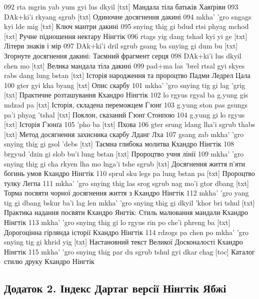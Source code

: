 \documentclass{article}
\begin{document}
092 rta mgrin yab yum gyi lus dkyil [txt] Мандала тіла батьків Хаяґріви
093 DAk+ki'i rkyang sgrub [txt] Одиночне досягнення дакині
094 mkha' 'gro sngags kyi lde mig [txt] Ключ мантри дакині
095 snying thig gi bdud rtsi phyag mchod [txt] Ручне підношення нектару Нінгтік
096 rtags yig dang tshad kyi yi ge [txt] Літери знаків і мір
097 DAk+ki'i dril sgrub gsang ba snying gi dum bu [txt] Згорнуте досягнення дакині: Таємний фрагмент серця
098 DAk+ki'i lus dkyil chen mo [txt] Велика мандала тіла дакині
099 pad+ma las 'brel rtsal gyi skyes rabs dang lung bstan [txt] Історія народження та пророцтво Падми Ледрел Цала
100 gter gyi kha byang [txt] Опис скарбу
101 mkha' 'gro snying tig gi lag 'grig [txt] Практичне розташування Кхандро Нінгтік
102 lo rgyus rgyal ba g.yung gis mdzad pa [txt] Історія, складена переможцем Ґ'юнґ
103 g.yung ston pas gsungs pa'i phyag 'tshal [txt] Поклон, сказаний Ґ'юнґ Стонпою
104 g.yung gi lo rgyus [txt] Історія Ґ'юнґа
105 'pho ba [txt] Пхова
106 gter srung ldang lha'i sgrub thabs [txt] Метод досягнення захисника скарбу Лданг Лха
107 gsang zab mkha' 'gro snying thig gi gsol 'debs [txt] Таємна глибока молитва Кхандро Нінгтік
108 brgyud 'dzin gi slob bu'i lung bstan [txt] Пророцтво учня лінії
109 mkha' 'gro snying thig gi cha rkyen lha mo lnga'i tshe sgrub [txt] Досягнення життя п'яти богинь умов Кхандро Нінгтік
110 sprul sku legs pa lung bstan pa [txt] Пророцтво тулку Легпа
111 mkha' 'gro snying thig las srog sgrub nag mo'i gtor dbang [txt] Торма посвяти чорної досягнення життя з Кхандро Нінгтік
112 mkha' 'gro yang tig gi dbang bskur ba'i lag len mkha' 'gro snying thig gi dkyil 'khor bri tshul [txt] Практика надання посвяти Кхандро Янгтік: Стиль малювання мандали Кхандро Нінгтік
113 mkha' 'gro snying thig gi lo rgyus rin po che'i phreng ba [txt] Дорогоцінна гірлянда історії Кхандро Нінгтік
114 rdzogs pa chen po mkha' 'gro snying tig gi khrid yig [txt] Настановний текст Великої Досконалості Кхандро Нінгтік
115 mkha' 'gro snying thig par du sgrub tshul gyi dkar chag [toc] Каталог стилю друку Кхандро Нінгтік

\newpage
\subsection{Додаток 2. Індекс Дартаг версії Нінгтік Ябжі}
\end{document}
